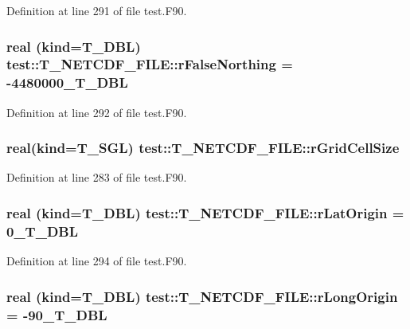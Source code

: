 Definition at line 291 of file test.F90.

\hypertarget{typetest_1_1_t___n_e_t_c_d_f___f_i_l_e_aa4b10c236acf5fc43ac821d9143b4408}{
\subsubsection[{rFalseNorthing}]{\setlength{\rightskip}{0pt plus 5cm}real (kind={\bf T\_\-DBL}) {\bf test::T\_\-NETCDF\_\-FILE::rFalseNorthing} = -\/4480000\_\-T\_\-DBL}}
\label{typetest_1_1_t___n_e_t_c_d_f___f_i_l_e_aa4b10c236acf5fc43ac821d9143b4408}


Definition at line 292 of file test.F90.

\hypertarget{typetest_1_1_t___n_e_t_c_d_f___f_i_l_e_a9e9f182e86a102794cbb1873facadbf3}{
\subsubsection[{rGridCellSize}]{\setlength{\rightskip}{0pt plus 5cm}real(kind={\bf T\_\-SGL}) {\bf test::T\_\-NETCDF\_\-FILE::rGridCellSize}}}
\label{typetest_1_1_t___n_e_t_c_d_f___f_i_l_e_a9e9f182e86a102794cbb1873facadbf3}


Definition at line 283 of file test.F90.

\hypertarget{typetest_1_1_t___n_e_t_c_d_f___f_i_l_e_a4f81c48c7e0b4f2f125a6f623fc34c51}{
\subsubsection[{rLatOrigin}]{\setlength{\rightskip}{0pt plus 5cm}real (kind={\bf T\_\-DBL}) {\bf test::T\_\-NETCDF\_\-FILE::rLatOrigin} = 0\_\-T\_\-DBL}}
\label{typetest_1_1_t___n_e_t_c_d_f___f_i_l_e_a4f81c48c7e0b4f2f125a6f623fc34c51}


Definition at line 294 of file test.F90.

\hypertarget{typetest_1_1_t___n_e_t_c_d_f___f_i_l_e_a4e39d5abd1833b7d7ff67976dba62637}{
\subsubsection[{rLongOrigin}]{\setlength{\rightskip}{0pt plus 5cm}real (kind={\bf T\_\-DBL}) {\bf test::T\_\-NETCDF\_\-FILE::rLongOrigin} = -\/90\_\-T\_\-DBL}}
\label{typetest_1_1_t___n_e_t_c_d_f___f_i_l_e_a4e39d5abd1833b7d7ff67976dba62637}


